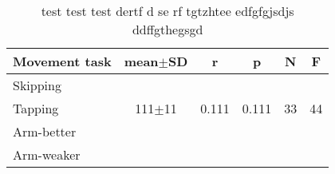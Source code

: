 \begin{table}[h]
	\caption{test test test dertf d se rf tgtzhtee edfgfgjsdjs ddffgthegsgd} \vspace{0.25cm}
\centering

\label{tab:anthropo}

\begin{tabular}{lccccc}
\toprule
\textbf{Movement task}& \textbf{mean$\pm$SD }& \textbf{r} & \textbf{p} & \textbf{N} &\textbf{F}\\ 
\midrule
Skipping 	&  &  &  & & \\  
Tapping& 111$\pm$11 & 0.111 & 0.111 & 33&44 \\
Arm-better&  &  &  &  &\\ 
Arm-weaker&  &  &  &  &\\  
\bottomrule
\end{tabular} 
\end{table}
